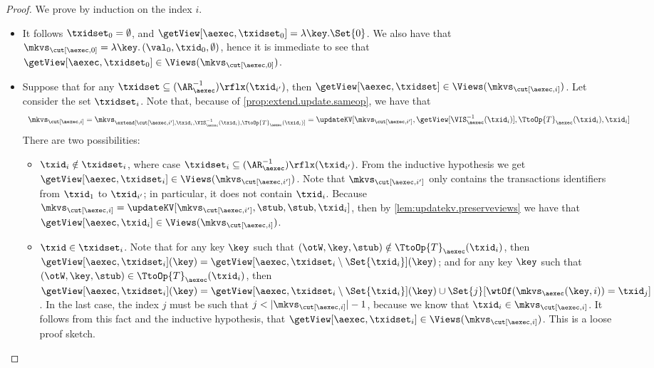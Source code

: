 \begin{proof}
We prove by induction on the index $i$. 
\begin{itemize}
\item {} It follows $\txidset_{0} = \emptyset$, and $\getView[\aexec, \txidset_{0}] = \lambda \key. \Set{0}$. 
We also have that $\mkvs_{\cut[\aexec, 0]} = \lambda \key \ldotp (\val_0, \txid_{0}, \emptyset)$, hence 
it is immediate to see that $\getView[\aexec, \txidset_{0}] \in \Views(\mkvs_{\cut[\aexec, 0]})$.

\item {}
Suppose that for any $\txidset \subseteq (\AR_{\aexec}^{-1})\rflx(\txid_{i'})$, 
then $\getView[\aexec, \txidset] \in \Views(\mkvs_{\cut[\aexec, i]})$. 
Let consider the set $\txidset_{i}$.
Note that, because of \cref{prop:extend.update.sameop}, we have that
\[
\begin{array}{l}
\mkvs_{\cut[\aexec, i]} =
\mkvs_{\extend[\cut[\aexec, i'], \txid_{i}, \VIS^{-1}_{\aexec}(\txid_{i}), \TtoOp{T}_{\aexec}(\txid_{i})]} 
= \updateKV[\mkvs_{\cut[\aexec, i']}, \getView[\VIS^{-1}_{\aexec}(\txid_{i})], \TtoOp{T}_{\aexec}(\txid_{i}), \txid_{i}]
\end{array}
\]
There are two possibilities:
\begin{itemize}
\item $\txid_{i} \notin \txidset_{i}$, where case $\txidset_{i} \subseteq (\AR_{\aexec}^{-1})\rflx(\txid_{i'})$.
From the inductive hypothesis we get $\getView[\aexec, \txidset_{i}] \in \Views(\mkvs_{\cut[\aexec, i']})$. 
Note that $\mkvs_{\cut[\aexec, i']}$ only contains the transactions identifiers from $\txid_{1}$ to $\txid_{i'}$;
in particular, it does not contain $\txid_{i}$. 
Because $\mkvs_{\cut[\aexec, i]} = \updateKV[\mkvs_{\cut[\aexec, i']}, \stub, \stub, \txid_{i}]$, 
then by \cref{lem:updatekv.preserveviews} we have that $\getView[\aexec, \txid_{i}] \in \Views(\mkvs_{\cut[\aexec, i]})$.

\item $\txid \in \txidset_{i}$. Note that for any key $\key$ such that 
$(\otW, \key, \stub) \notin \TtoOp{T}_{\aexec}(\txid_{i})$, then 
$\getView[\aexec, \txidset_{i}](\key) = \getView[\aexec, \txidset_{i} \setminus \Set{\txid_{i}}](\key)$; 
and for any key $\key$ such that $(\otW, \key, \stub) \in \TtoOp{T}_{\aexec}(\txid_{i})$, 
then $\getView[\aexec, \txidset_{i}](\key) = \getView[\aexec, \txidset_{i} \setminus \Set{\txid_{i}}](\key) 
\cup \Set{j}[\wtOf(\mkvs_{\aexec}(\key, i)) = \txid_{j}]$. 
In the last case, the index $j$ must be such that $j < \lvert \mkvs_{\cut[\aexec, i]} \rvert - 1$, 
because we know that $\txid_{i} \in \mkvs_{\cut[\aexec, i]}$. 
It follows from this fact and the inductive hypothesis, 
that $\getView[\aexec, \txidset_{i}] \in \Views(\mkvs_{\cut[\aexec, i]})$.
\ac{This is a loose proof sketch.} 
\end{itemize}
\end{itemize}
\end{proof}

